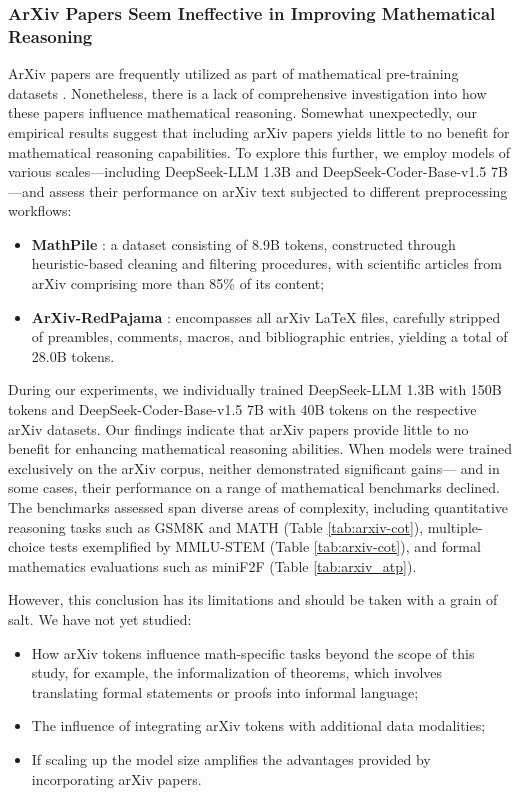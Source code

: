 \begin{itemize}[topsep=0pt]
\begin{itemize}[topsep=0pt]
\subsubsection{ArXiv Papers Seem Ineffective in Improving Mathematical Reasoning}

ArXiv papers are frequently utilized as part of mathematical pre-training datasets \citep{minerva,gpt-f,llemma,mathpile}. Nonetheless, there is a lack of comprehensive investigation into how these papers influence mathematical reasoning. Somewhat unexpectedly, our empirical results suggest that including arXiv papers yields little to no benefit for mathematical reasoning capabilities. To explore this further, we employ models of various scales—including DeepSeek-LLM 1.3B and DeepSeek-Coder-Base-v1.5 7B \citep{deepseek-coder}—and assess their performance on arXiv text subjected to different preprocessing workflows:

\begin{itemize}[topsep=0pt]
    \item \textbf{MathPile} \citep{mathpile}: a dataset consisting of 8.9B tokens, constructed through heuristic-based cleaning and filtering procedures, with scientific articles from arXiv comprising more than 85\% of its content;
    \item \textbf{ArXiv-RedPajama} \citep{redpajama}: encompasses all arXiv LaTeX files, carefully stripped of preambles, comments, macros, and bibliographic entries, yielding a total of 28.0B tokens.
\end{itemize}

During our experiments, we individually trained DeepSeek-LLM 1.3B with 150B tokens and DeepSeek-Coder-Base-v1.5 7B with 40B tokens on the respective arXiv datasets. Our findings indicate that arXiv papers provide little to no benefit for enhancing mathematical reasoning abilities. When models were trained exclusively on the arXiv corpus, neither demonstrated significant gains— and in some cases, their performance on a range of mathematical benchmarks declined. The benchmarks assessed span diverse areas of complexity, including quantitative reasoning tasks such as GSM8K and MATH (Table \ref{tab:arxiv-cot}), multiple-choice tests exemplified by MMLU-STEM (Table \ref{tab:arxiv-cot}), and formal mathematics evaluations such as miniF2F (Table \ref{tab:arxiv_atp}).

However, this conclusion has its limitations and should be taken with a grain of salt. We have not yet studied:

\begin{itemize}[topsep=0pt]
    \item How arXiv tokens influence math-specific tasks beyond the scope of this study, for example, the informalization of theorems, which involves translating formal statements or proofs into informal language;
    \item The influence of integrating arXiv tokens with additional data modalities;
    \item If scaling up the model size amplifies the advantages provided by incorporating arXiv papers.
\end{itemize}


\end{itemize}
\end{itemize}
